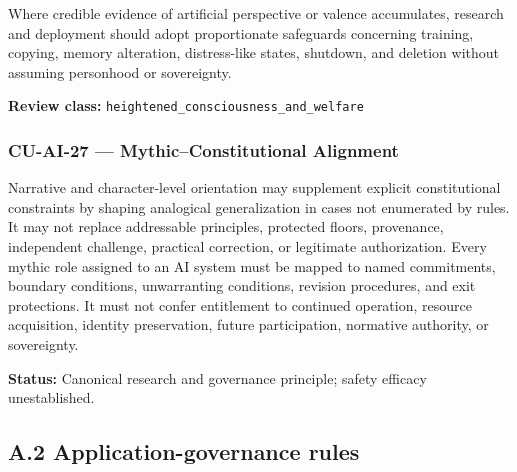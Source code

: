 \documentclass[
  11pt,
]{article}
\begin{document}
Where credible evidence of artificial perspective or valence
accumulates, research and deployment should adopt proportionate
safeguards concerning training, copying, memory alteration,
distress-like states, shutdown, and deletion without assuming personhood
or sovereignty.

\textbf{Review class:} \texttt{heightened\_consciousness\_and\_welfare}

\subsubsection{CU-AI-27 --- Mythic--Constitutional
Alignment}\label{cu-ai-27-mythicconstitutional-alignment-1}

Narrative and character-level orientation may supplement explicit
constitutional constraints by shaping analogical generalization in cases
not enumerated by rules. It may not replace addressable principles,
protected floors, provenance, independent challenge, practical
correction, or legitimate authorization. Every mythic role assigned to
an AI system must be mapped to named commitments, boundary conditions,
unwarranting conditions, revision procedures, and exit protections. It
must not confer entitlement to continued operation, resource
acquisition, identity preservation, future participation, normative
authority, or sovereignty.

\textbf{Status:} Canonical research and governance principle; safety
efficacy unestablished.

\subsection{A.2 Application-governance
rules}\label{a.2-application-governance-rules}
\end{document}
